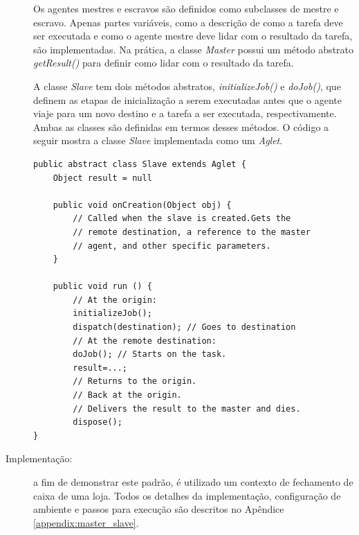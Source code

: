 \begin{description}
Os agentes mestres e escravos são definidos como subclasses de mestre e escravo. Apenas partes variáveis, como a descrição de como a tarefa deve ser executada e como o agente mestre deve lidar com o resultado da tarefa, são implementadas. Na prática, a classe \textit{Master} possui um método abstrato \textit{getResult()} para definir como lidar com o resultado da tarefa.

A classe \textit{Slave} tem dois métodos abstratos, \textit{initializeJob()} e \textit{doJob()}, que definem as etapas de inicialização a serem executadas antes que o agente viaje para um novo destino e a tarefa a ser executada, respectivamente. Ambas as classes são definidas em termos desses métodos. O código a seguir mostra a classe \textit{Slave} implementada como um \textit{Aglet}.

\begin{lstlisting}[firstnumber=1]
public abstract class Slave extends Aglet {
    Object result = null
 
    public void onCreation(Object obj) {
        // Called when the slave is created.Gets the
        // remote destination, a reference to the master
        // agent, and other specific parameters.
    }
 
    public void run () {
        // At the origin:
        initializeJob();
        dispatch(destination); // Goes to destination
        // At the remote destination:
        doJob(); // Starts on the task.
        result=...;
        // Returns to the origin.
        // Back at the origin.
        // Delivers the result to the master and dies.
        dispose();
}
\end{lstlisting}

\item[Implementação:] a fim de demonstrar este padrão, é utilizado um contexto de fechamento de caixa de uma loja. Todos os detalhes da implementação, configuração de ambiente e passos para execução são descritos no Apêndice \ref{appendix:master_slave}.

\end{description}



